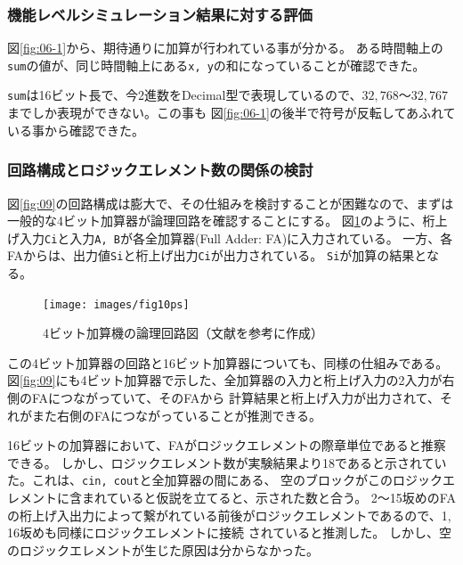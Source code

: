 \documentclass[uplatex]{jsarticle}
\begin{document}
\subsubsection{機能レベルシミュレーション結果に対する評価}

図\ref{fig:06-1}から、期待通りに加算が行われている事が分かる。
ある時間軸上の{\tt sum}の値が、同じ時間軸上にある{\tt x, y}の和になっていることが確認できた。

{\tt sum}は16ビット長で、今2進数をDecimal型で表現しているので、$32,768 ～ 32,767$までしか表現ができない。この事も
図\ref{fig:06-1}の後半で符号が反転してあふれている事から確認できた。

\subsubsection{回路構成とロジックエレメント数の関係の検討}

図\ref{fig:09}の回路構成は膨大で、その仕組みを検討することが困難なので、まずは一般的な4ビット加算器が論理回路を確認することにする。
図\ref{fig:10}のように、桁上げ入力{\tt Ci}と入力{\tt A, B}が各全加算器(Full Adder: FA)に入力されている。
一方、各FAからは、出力値{\tt Si}と桁上げ出力{\tt Ci}が出力されている。
{\tt Si}が加算の結果となる。

\begin{figure}[htb]
  \begin{center}
    \texttt{[image: images/fig10ps]}
    \caption{4ビット加算機の論理回路図（文献\cite{hdl}を参考に作成）}
    \label{fig:10}
  \end{center}
\end{figure}

この4ビット加算器の回路と16ビット加算器についても、同様の仕組みである。
図\ref{fig:09}にも4ビット加算器で示した、全加算器の入力と桁上げ入力の2入力が右側のFAにつながっていて、そのFAから
計算結果と桁上げ入力が出力されて、それがまた右側のFAにつながっていることが推測できる。

16ビットの加算器において、FAがロジックエレメントの際章単位であると推察できる。
しかし、ロジックエレメント数が実験結果より18であると示されていた。これは、{\tt cin, cout}と全加算器の間にある、
空のブロックがこのロジックエレメントに含まれていると仮説を立てると、示された数と合う。
2～15坂めのFAの桁上げ入出力によって繋がれている前後がロジックエレメントであるので、1, 16坂めも同様にロジックエレメントに接続
されていると推測した。
しかし、空のロジックエレメントが生じた原因は分からなかった。
\end{document}
